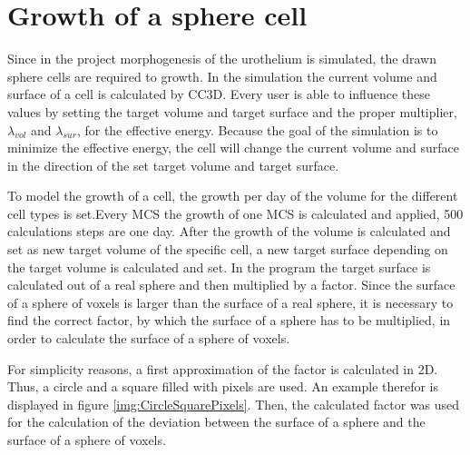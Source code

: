 \section{Growth of a sphere cell}
Since in the project morphogenesis of the urothelium is simulated, the drawn sphere cells are required to growth. \newline
In the simulation the current volume and surface of a cell is calculated by \ac{CC3D}. Every user is able to influence these values by setting the target volume and target surface and the proper multiplier, $\lambda_{vol}$ and $\lambda_{sur}$, for the effective energy. Because the goal of the simulation is to minimize the effective energy, the cell will change the current volume and surface in the direction of the set target volume and target surface. 

To model the growth of a cell, the growth per day of the volume for the different cell types is set.Every \ac{MCS} the growth of one \ac{MCS} is calculated and applied, 500 calculations steps are one day. After the growth of the volume is calculated and set as new target volume of the specific cell, a new target surface depending on the target volume is calculated and set. \newline
In the program the target surface is calculated out of a real sphere and then multiplied by a factor.
Since the surface of a sphere of voxels is larger than the surface of a real sphere, it is necessary to find the correct factor, by which the surface of a sphere has to be multiplied, in order to calculate the surface of a sphere of voxels. 

For simplicity reasons, a first approximation of the factor is calculated in 2D. Thus, a circle and a square filled with pixels are used. An example therefor is displayed in figure \ref{img:CircleSquarePixels}. Then, the calculated factor was used for the calculation of the deviation between the surface of a sphere and the surface of a sphere of voxels.


